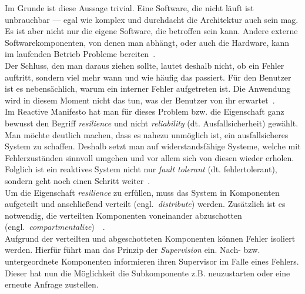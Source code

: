 Im Grunde ist diese Aussage trivial. Eine Software, die nicht läuft ist unbrauchbar --- egal wie komplex und durchdacht die Architektur auch sein mag.\\
Es ist aber nicht nur die eigene Software, die betroffen sein kann. Andere externe Softwarekomponenten, von denen man abhängt, oder auch die Hardware, kann im laufenden Betrieb Probleme bereiten~\cite[S.~33]{kuhn_reactive_2015}.\\
Der Schluss, den man daraus ziehen sollte, lautet deshalb nicht, ob ein Fehler auftritt, sondern viel mehr wann und wie häufig das passiert. Für den Benutzer ist es nebensächlich, warum ein interner Fehler aufgetreten ist. Die Anwendung wird in diesem Moment nicht das tun, was der Benutzer von ihr erwartet~\cite[S.~33]{kuhn_reactive_2015}.\\

Im Reactive Manifesto hat man für dieses Problem bzw. die Eigenschaft ganz bewusst den Begriff \textit{resilience} und nicht \textit{reliability} (dt. Ausfallsicherheit) gewählt. Man möchte deutlich machen, dass es nahezu unmöglich ist, ein ausfallsicheres System zu schaffen. Deshalb setzt man auf widerstandsfähige Systeme, welche mit Fehlerzuständen sinnvoll umgehen und vor allem sich von diesen wieder erholen. Folglich ist ein reaktives System nicht nur \textit{fault tolerant} (dt. fehlertolerant), sondern geht noch einen Schritt weiter~\cite[S.~34]{kuhn_reactive_2015}.\\

Um die Eigenschaft \textit{resilience} zu erfüllen, muss das System in Komponenten aufgeteilt und anschließend verteilt (engl.~\textit{distribute}) werden. Zusätzlich ist es notwendig, die verteilten Komponenten voneinander abzuschotten (engl.~\textit{compartmentalize})~\cite[S.~34]{kuhn_reactive_2015}~\cite[S.~7]{vernon_reactive_2016}.\\
Aufgrund der verteilten und abgeschotteten Komponenten können Fehler isoliert werden. Hierfür führt man das Prinzip der \textit{Supervision} ein. Nach- bzw. untergeordnete Komponenten informieren ihren Supervisor im Falle eines Fehlers. Dieser hat nun die Möglichkeit die Subkomponente z.B. neuzustarten oder eine erneute Anfrage zustellen. 

